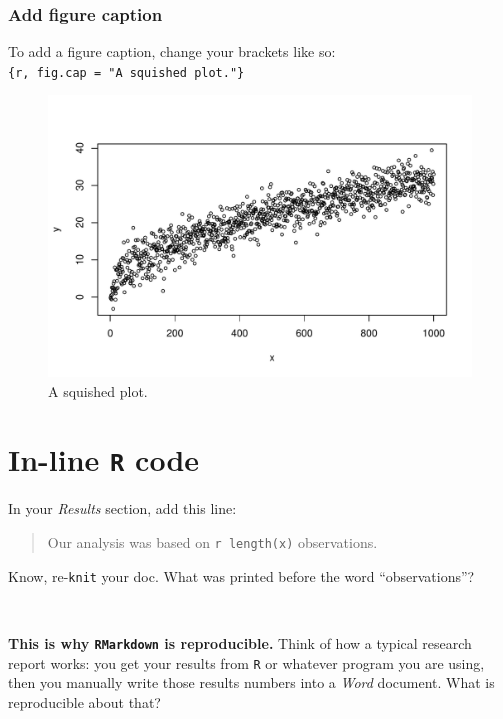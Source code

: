 \documentclass[
]{book}
\begin{document}
\hypertarget{add-figure-caption}{%
\subsubsection*{Add figure caption}\label{add-figure-caption}}

To add a figure caption, change your brackets like so: \texttt{\{r,\ fig.cap\ =\ "A\ squished\ plot."\}}

\begin{figure}
\includegraphics[width=504px]{figures/unnamed-chunk-215-1} \caption{A squished plot.}\label{fig:unnamed-chunk-215}
\end{figure}

\hypertarget{in-line-r-code}{%
\section*{\texorpdfstring{In-line \texttt{R} code}{In-line R code}}\label{in-line-r-code}}

In your \emph{Results} section, add this line:

\begin{quote}
Our analysis was based on \texttt{\textasciigrave{}r\ length(x)\textasciigrave{}} observations.
\end{quote}

Know, re-\texttt{knit} your doc. What was printed before the word ``observations''?

~

\textbf{This is why \texttt{RMarkdown} is reproducible.} Think of how a typical research report works: you get your results from
\texttt{R} or whatever program you are using, then you manually write those results numbers into a \emph{Word} document. What is reproducible about that?
\end{document}
